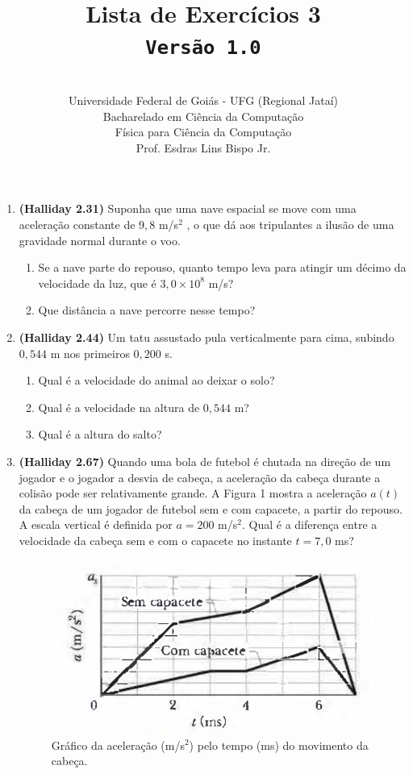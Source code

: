 \documentclass[12pt,a4paper,oneside]{article}
\author{\\Universidade Federal de Goiás - UFG (Regional Jataí) \\Bacharelado em Ciência da Computação \\Física para Ciência da Computação \\Prof. Esdras Lins Bispo Jr.}
\title{
	{\sc \huge Lista de Exercícios 3} 
	\\{\tt Versão 1.0}
}
\begin{document}
\maketitle

\begin{enumerate}

\section{Conceitos}
	
	\item {\bf (Halliday 2.31)} Suponha que uma nave espacial se move com uma aceleração constante de $9,8$ m/s$^2$ , o que dá aos tripulantes a ilusão de uma gravidade normal durante o voo. 
		\begin{enumerate}
			\item Se a nave parte do repouso, quanto
			tempo leva para atingir um décimo da velocidade da luz, que é $3,0 \times 10^8$  m/s?
			\item Que distância a nave percorre nesse tempo?
		\end{enumerate}
	
	\item {\bf (Halliday 2.44)} Um tatu assustado pula verticalmente para cima, subindo $0,544$ m nos primeiros $0,200$ s. 
		\begin{enumerate}
			\item Qual é a velocidade do animal ao deixar o solo?
			\item Qual é a velocidade na altura de $0,544$ m?
			\item Qual é a altura do salto?
		\end{enumerate}	
	
	\item {\bf (Halliday 2.67)} Quando uma bola de futebol é chutada na direção de um jogador e o jogador a desvia de cabeça, a aceleração da cabeça durante a colisão pode ser relativamente grande. A Figura 1 mostra a aceleração $a(t)$ da cabeça de um jogador de futebol sem e com capacete, a partir do repouso. A escala vertical é definida por $a =
	200$ m/s$^2$. Qual é a diferença entre a velocidade da cabeça sem e com o capacete no instante $t = 7,0$ ms?
		\begin{figure}
			\begin{center}
				\includegraphics[scale=0.7]{imagens/grafico}
			\end{center}
			\caption{Gráfico da aceleração (m/s$^2$) pelo tempo (ms) do movimento da cabeça.}
		\end{figure}
		


\end{enumerate}
\end{document}
